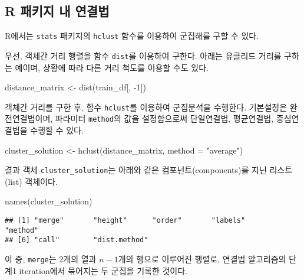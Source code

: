 \documentclass[
]{book}
\newenvironment{Shaded}{\begin{snugshade}}{\end{snugshade}}
\newcommand{\AttributeTok}[1]{\textcolor[rgb]{0.77,0.63,0.00}{#1}}
\newcommand{\DecValTok}[1]{\textcolor[rgb]{0.00,0.00,0.81}{#1}}
\newcommand{\FunctionTok}[1]{\textcolor[rgb]{0.00,0.00,0.00}{#1}}
\newcommand{\NormalTok}[1]{#1}
\newcommand{\OtherTok}[1]{\textcolor[rgb]{0.56,0.35,0.01}{#1}}
\newcommand{\SpecialCharTok}[1]{\textcolor[rgb]{0.00,0.00,0.00}{#1}}
\newcommand{\StringTok}[1]{\textcolor[rgb]{0.31,0.60,0.02}{#1}}
\begin{document}
\hypertarget{hclust}{%
\subsection{R 패키지 내 연결법}\label{hclust}}

R에서는 \texttt{stats} 패키지의 \texttt{hclust} 함수를 이용하여 군집해를 구할 수 있다.

우선, 객체간 거리 행렬을 함수 \texttt{dist}를 이용하여 구한다. 아래는 유클리드 거리를 구하는 예이며, 상황에 따라 다른 거리 척도를 이용할 수도 있다.

\begin{Shaded}
\begin{Highlighting}[]
\NormalTok{distance\_matrix }\OtherTok{\textless{}{-}} \FunctionTok{dist}\NormalTok{(train\_df[, }\SpecialCharTok{{-}}\DecValTok{1}\NormalTok{])}
\end{Highlighting}
\end{Shaded}

객체간 거리를 구한 후, 함수 \texttt{hclust}를 이용하여 군집분석을 수행한다. 기본설정은 완전연결법이며, 파라미터 \texttt{method}의 값을 설정함으로써 단일연결법, 평균연결법, 중심연결법을 수행할 수 있다.

\begin{Shaded}
\begin{Highlighting}[]
\NormalTok{cluster\_solution }\OtherTok{\textless{}{-}} \FunctionTok{hclust}\NormalTok{(distance\_matrix, }\AttributeTok{method =} \StringTok{"average"}\NormalTok{)}
\end{Highlighting}
\end{Shaded}

결과 객체 \texttt{cluster\_solution}는 아래와 같은 컴포넌트(components)를 지닌 리스트(list) 객체이다.

\begin{Shaded}
\begin{Highlighting}[]
\FunctionTok{names}\NormalTok{(cluster\_solution)}
\end{Highlighting}
\end{Shaded}

\begin{verbatim}
## [1] "merge"       "height"      "order"       "labels"      "method"     
## [6] "call"        "dist.method"
\end{verbatim}

이 중, \texttt{merge}는 2개의 열과 \(n - 1\)개의 행으로 이루어진 행렬로, 연결법 알고리즘의 단계1 iteration에서 묶어지는 두 군집을 기록한 것이다.
\end{document}
